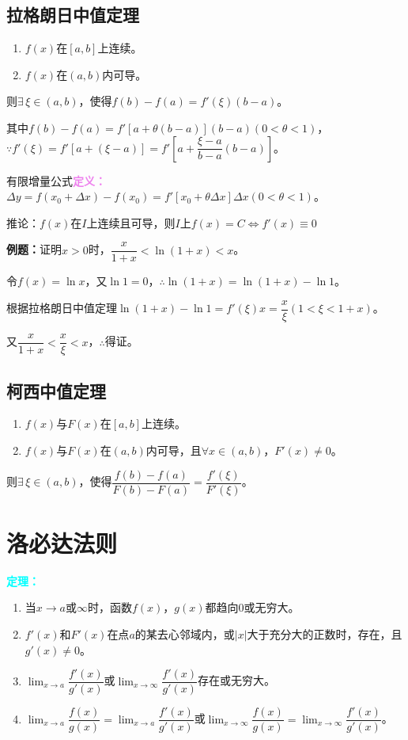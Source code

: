 \documentclass[UTF8, 12pt]{ctexart}
\begin{document}
\subsection{拉格朗日中值定理}

\begin{enumerate}
    \item $f(x)$在$[a,b]$上连续。
    \item $f(x)$在$(a,b)$内可导。
\end{enumerate}

则$\exists\,\xi\in(a,b)$，使得$f(b)-f(a)=f'(\xi)(b-a)$。

其中$f(b)-f(a)=f'[a+\theta(b-a)](b-a)(0<\theta<1)$，$\because f'(\xi)=f'[a+(\xi-a)]=f'[a+\dfrac{\xi-a}{b-a}(b-a)]$。

有限增量公式\textcolor{violet}{\textbf{定义：}}$\Delta y=f(x_0+\Delta x)-f(x_0)=f'[x_0+\theta\Delta x]\Delta x(0<\theta<1)$。

推论：$f(x)$在$I$上连续且可导，则$I$上$f(x)=C\Leftrightarrow f'(x)\equiv 0$

\textbf{例题：}证明$x>0$时，$\dfrac{x}{1+x}<\ln(1+x)<x$。

令$f(x)=\ln x$，又$\ln 1=0$，$\therefore\ln(1+x)=\ln(1+x)-\ln 1$。

根据拉格朗日中值定理$\ln(1+x)-\ln 1=f'(\xi)x=\dfrac{x}{\xi}(1<\xi<1+x)$。

又$\dfrac{x}{1+x}<\dfrac{x}{\xi}<x$，$\therefore$得证。

\subsection{柯西中值定理}

\begin{enumerate}
    \item $f(x)$与$F(x)$在$[a,b]$上连续。
    \item $f(x)$与$F(x)$在$(a,b)$内可导，且$\forall x\in(a,b)$，$F'(x)\neq 0$。
\end{enumerate}

则$\exists\,\xi\in(a,b)$，使得$\dfrac{f(b)-f(a)}{F(b)-F(a)}=\dfrac{f'(\xi)}{F'(\xi)}$。

\section{洛必达法则}

\textcolor{aqua}{\textbf{定理：}}

\begin{enumerate}
    \item 当$x\to a\text{或}\infty$时，函数$f(x)$，$g(x)$都趋向0或无穷大。
    \item $f'(x)$和$F'(x)$在点$a$的某去心邻域内，或$\vert x\vert$大于充分大的正数时，存在，且$g'(x)\neq 0$。
    \item $\lim_{x\to a}\dfrac{f'(x)}{g'(x)}$或$\lim_{x\to\infty}\dfrac{f'(x)}{g'(x)}$存在或无穷大。
    \item $\lim_{x\to a}\dfrac{f(x)}{g(x)}=\lim_{x\to a}\dfrac{f'(x)}{g'(x)}$或$\lim_{x\to\infty}\dfrac{f(x)}{g(x)}=\lim_{x\to\infty}\dfrac{f'(x)}{g'(x)}$。
\end{enumerate}
\end{document}
